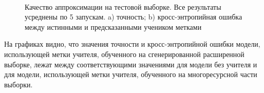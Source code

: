 \begin{figure}[h!t]\center
{}
\\
\caption{Качество аппроксимации на тестовой выборке. Все результаты усреднены по 5 запускам. a) точность; b) кросс-энтропийная ошибка между истинными и предсказанными учеником метками}
\end{figure}

На графиках видно, что значения точности и кросс-энтропийной ошибки модели, использующей метки учителя, обученного на сгенерированной расширенной выборке, лежат между соответствующими значениями для модели без учителя и для модели, использующей метки учителя, обученного на многоресурсной части выборки.

